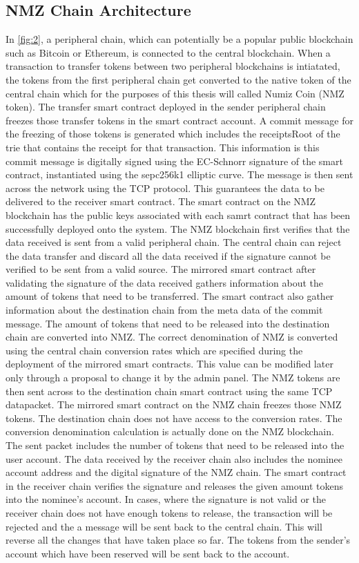 \documentclass[a4paper,twoside,phd]{BYUPhys}
\begin{document}
\subsection{NMZ Chain Architecture}
In \ref{fig:2}, a peripheral chain, which can potentially be a popular public blockchain such as Bitcoin or Ethereum, is connected to the central blockchain. When a transaction to transfer tokens between two peripheral blockchains is intiatated, the tokens from the first peripheral chain get converted to the native token of the central chain which for the purposes of this thesis will called Numiz Coin (NMZ token). The transfer smart contract deployed in the sender peripheral chain freezes those transfer tokens in the smart contract account. A commit message for the freezing of those tokens is generated which includes the receiptsRoot of the trie that contains the receipt for that transaction. This information is this commit message is digitally signed using the EC-Schnorr signature of the smart contract, instantiated using the sepc256k1 elliptic curve. The message is then sent across the network using the TCP protocol. This guarantees the data to be delivered to the receiver smart contract. The smart contract on the NMZ blockchain has the public keys associated with each samrt contract that has been successfully deployed onto the system. The NMZ blockchain first verifies that the data received is sent from a valid peripheral chain. The central chain can reject the data transfer and discard all the data received if the signature cannot be verified to be sent from a valid source. The mirrored smart contract after validating the signature of the data received gathers information about the amount of tokens that need to be transferred. The smart contract also gather information about the destination chain from the meta data of the commit message. The amount of tokens that need to be released into the destination chain are converted into NMZ. The correct denomination of NMZ is converted using the central chain conversion rates which are specified during the deployment of the mirrored smart contracts. This value can be modified later only through a proposal to change it by the admin panel. The NMZ tokens are then sent across to the destination chain smart contract using the same TCP datapacket. The mirrored smart contract on the NMZ chain freezes those NMZ tokens. The destination chain does not have access to the conversion rates. The conversion denomination calculation is actually done on the NMZ blockchain. The sent packet includes the number of tokens that need to be released into the user account. The data received by the receiver chain also includes the nominee account address and the digital signature of the NMZ chain. The smart contract in the receiver chain verifies the signature and releases the given amount tokens into the nominee's account. In cases, where the signature is not valid or the receiver chain does not have enough tokens to release, the transaction will be rejected and the a message will be sent back to the central chain. This will reverse all the changes that have taken place so far. The tokens from the sender's account which have been reserved will be sent back to the account.
\end{document}
